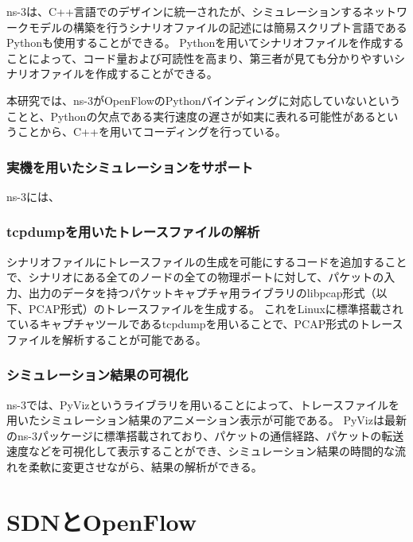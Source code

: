 ns-3は、C++言語でのデザインに統一されたが、シミュレーションするネットワークモデルの構築を行うシナリオファイルの記述には簡易スクリプト言語であるPythonも使用することができる。
Pythonを用いてシナリオファイルを作成することによって、コード量および可読性を高まり、第三者が見ても分かりやすいシナリオファイルを作成することができる。

本研究では、ns-3がOpenFlowのPythonバインディングに対応していないということと、Pythonの欠点である実行速度の遅さが如実に表れる可能性があるということから、C++を用いてコーディングを行っている。

\subsubsection{実機を用いたシミュレーションをサポート}


ns-3には、

\subsubsection{tcpdumpを用いたトレースファイルの解析}

シナリオファイルにトレースファイルの生成を可能にするコードを追加することで、シナリオにある全てのノードの全ての物理ポートに対して、パケットの入力、出力のデータを持つパケットキャプチャ用ライブラリのlibpcap形式（以下、PCAP形式）のトレースファイルを生成する。
これをLinuxに標準搭載されているキャプチャツールであるtcpdumpを用いることで、PCAP形式のトレースファイルを解析することが可能である。

\subsubsection{シミュレーション結果の可視化}

ns-3では、PyVizというライブラリを用いることによって、トレースファイルを用いたシミュレーション結果のアニメーション表示が可能である。
PyVizは最新のns-3パッケージに標準搭載されており、パケットの通信経路、パケットの転送速度などを可視化して表示することができ、シミュレーション結果の時間的な流れを柔軟に変更させながら、結果の解析ができる。

\section{SDNとOpenFlow}

